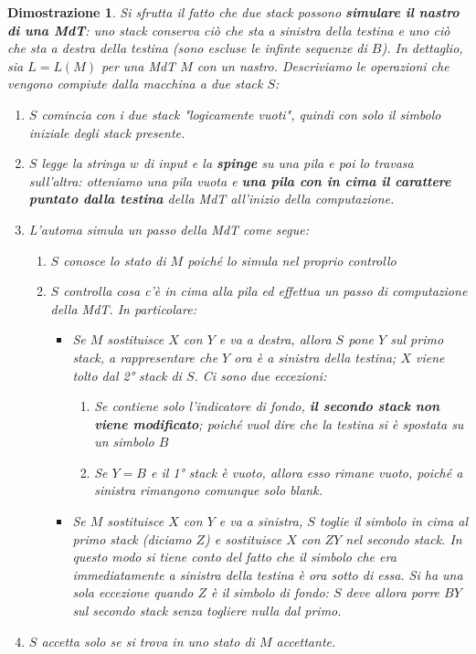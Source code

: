 \documentclass[12pt]{article}
\newtheorem{Dimostrazione}{Dimostrazione}[subsection]
\begin{document}
\begin{Dimostrazione}
    Si sfrutta il fatto che due stack possono \textbf{simulare il nastro di una MdT}: uno stack conserva ciò che sta a sinistra della testina e uno ciò che sta a destra della testina (sono escluse le infinte sequenze di $B$). In dettaglio, sia $L = L(M)$ per una MdT $M$ con un nastro. Descriviamo le operazioni che vengono compiute dalla macchina a due stack $S$:
    \begin{enumerate}
        \item $S$ comincia con i due stack "logicamente vuoti", quindi con solo il simbolo iniziale degli stack presente.
        \item $S$ legge la stringa $w$ di input e la \textbf{spinge} su una pila e poi lo travasa sull'altra: otteniamo una pila vuota e \textbf{una pila con in cima il carattere puntato dalla testina} della MdT all'inizio della computazione.
        \item L'automa simula un passo della MdT come segue:
        \begin{enumerate}
            \item $S$ conosce lo stato di $M$ poiché lo simula nel proprio controllo
            \item $S$ controlla cosa c'è in cima alla pila ed effettua un passo di computazione della MdT. In particolare:
            \begin{itemize}
                \item Se $M$ sostituisce $X$ con $Y$ e va a destra, allora $S$ pone $Y$ sul primo stack, a rappresentare che $Y$ ora è a sinistra della testina; $X$ viene tolto dal 2° stack di $S$. Ci sono due eccezioni:
                \begin{enumerate}
                    \item Se contiene solo l'indicatore di fondo, \textbf{il secondo stack non viene modificato}; poiché vuol dire che la testina si è spostata su un simbolo $B$
                    \item Se $Y = B$ e il 1° stack è vuoto, allora esso rimane vuoto, poiché a sinistra rimangono comunque solo blank.
                \end{enumerate}
                \item Se $M$ sostituisce $X$ con $Y$ e va a sinistra, $S$ toglie il simbolo in cima al primo stack (diciamo $Z$) e sostituisce $X$ con $ZY$ nel secondo stack. In questo modo si tiene conto del fatto che il simbolo che era immediatamente a sinistra della testina è ora sotto di essa. Si ha una sola eccezione quando $Z$ è il simbolo di fondo: $S$ deve allora porre $BY$ sul secondo stack senza togliere nulla dal primo.
            \end{itemize}
        \end{enumerate}
        \item $S$ accetta solo se si trova in uno stato di $M$ accettante.
    \end{enumerate}
\end{Dimostrazione}
\end{document}
